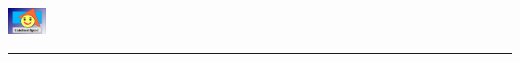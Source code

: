 \begin{titlepage} %
%
   \begin{flushright}
      {\includegraphics[width=1cm]{images/placeholder.eps} }
      \mbox{}\vspace{3cm}\
      {\Huge \sf \bf \flushright
         \GMTitle{} %
      }
      \rule[-1mm]{\textwidth}{2mm}\\
     {{\ifthenelse{\equal{\GMSubtitle}{}}
        { \mbox{}\\ }%
        { {\Large \sf \bf  \GMSubtitle{} \\ }} %
     }}%
       \vspace{6cm}
       {{\ifthenelse{\equal{\GMAuthor}{}}
        { \mbox{}\\ }%
        { {\Large \sf   \GMAuthor{} \\ }} %
     }}
   \end{flushright}
   \vspace{5cm}
   \begin{flushleft} {
       \large \sf \em
       \GMDate{} 
   }
   \end{flushleft}
\CoverEnd %
\end{titlepage}%
